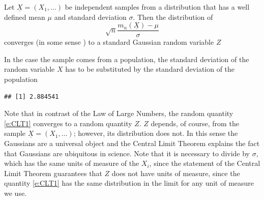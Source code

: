       \begin{theorem}
      	\label{t:CLT}
      	Let $\underline X = ( X_1 , \ldots )$ be independent samples from a distribution that has a well defined mean $\mu$ and standard deviation $\sigma$. Then the distribution of 
      	\begin{equation}
      		\label{e:CLT1}
      		\sqrt{n}\frac{ m_n(\underline X) - \mu }{\sigma } 
      	\end{equation}
      	converges (in some sense ) to a standard Gaussian random variable $Z$  
      \end{theorem}
     In the case the sample comes from a population, the standard deviation of the random variable $X$ has to be substituted by the standard deviation of the population 
\begin{knitrout}
\color{fgcolor}\begin{kframe}
\begin{alltt}
\end{alltt}
\begin{verbatim}
## [1] 2.884541
\end{verbatim}
\end{kframe}
\end{knitrout}
Note that in contrast of the Law of Large Numbers, the random quantity \eqref{e:CLT1} converges to a random quantity $Z$. $Z$ depends, of course, from the sample $\underline X = (X_1, \ldots )$; however, its distribution does not. In this sense the Gaussians are a universal object and the Central Limit Theorem explains the fact that Gaussians are ubiquitous in science. Note that it is necessary to divide by $\sigma$, which has the same units of measure of the $X_i$, since the statement of the Central Limit Theorem guarantees that $Z$ does not have units of measure, since the quantity \eqref{e:CLT1}  has the same distribution in the limit for any unit of measure we use. 
   
